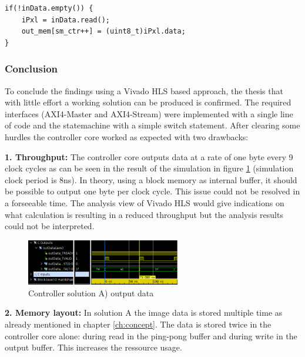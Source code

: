 \begin{minipage}{\textwidth}
\begin{lstlisting}[style=CStyle, caption=Pixel read store with query,
label=lst:runinstream2]
if(!inData.empty()) {
    iPxl = inData.read();
    out_mem[sm_ctr++] = (uint8_t)iPxl.data;
}\end{lstlisting}
\end{minipage}

\clearpage
\subsubsection*{Conclusion}
To conclude the findings using a Vivado HLS based approach, the thesis that
with little effort a working solution can be produced is confirmed. The required
interfaces (AXI4-Master and AXI4-Stream) were implemented with a single line of
code and the statemachine with a simple switch statement. After
clearing some hurdles the controller core worked as expected with two drawbacks:

\vspace{1ex}
\textbf{1. Throughput:} The controller core outputs data at a rate of one byte
every 9 clock cycles as can be seen in the result of the simulation in figure
\ref{fig:shlowhlsoutput} (simulation clock period is 8ns).
In theory, using a block memory as internal buffer, it
should be possible to output one byte per clock cycle. This issue could not be
resolved in a forseeable time. The analysis view of Vivado HLS would give
indications on what calculation is resulting in a reduced throughput but the
analysis results could not be interpreted.

\begin{figure}[tb!]
    \centering
    \includegraphics[width=0.6\textwidth]{images/controller/hlscontrolleroutput.png}
    \caption{Controller solution A) output data}
    \label{fig:shlowhlsoutput}
\end{figure}

\vspace{1ex}
\textbf{2. Memory layout:} In solution A the image data is stored multiple time
as already mentioned in chapter \ref{ch:concept}. The data is stored twice in
the controller core alone: during read in the ping-pong buffer and during write
in the output buffer. This increases the ressource usage.

